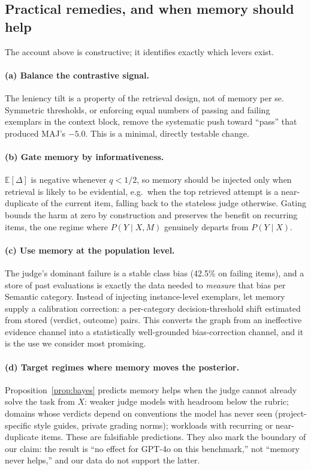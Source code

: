 \documentclass[11pt]{article}
\begin{document}
\subsection{Practical remedies, and when memory should help}
\label{sec:remedies}

The account above is constructive; it identifies exactly which levers exist.

\paragraph{(a) Balance the contrastive signal.} The leniency tilt is a property of the retrieval design, not of memory per se. Symmetric thresholds, or enforcing equal numbers of passing and failing exemplars in the context block, remove the systematic push toward ``pass'' that produced MAJ's $-5.0$. This is a minimal, directly testable change.

\paragraph{(b) Gate memory by informativeness.} $\mathbb{E}[\Delta]$ is negative whenever $q<1/2$, so memory should be injected only when retrieval is likely to be evidential, e.g.\ when the top retrieved attempt is a near-duplicate of the current item, falling back to the stateless judge otherwise. Gating bounds the harm at zero by construction and preserves the benefit on recurring items, the one regime where $P(Y\mid X,M)$ genuinely departs from $P(Y\mid X)$.

\paragraph{(c) Use memory at the population level.} The judge's dominant failure is a stable class bias (42.5\% on failing items), and a store of past evaluations is exactly the data needed to \emph{measure} that bias per Semantic category. Instead of injecting instance-level exemplars, let memory supply a calibration correction: a per-category decision-threshold shift estimated from stored (verdict, outcome) pairs. This converts the graph from an ineffective evidence channel into a statistically well-grounded bias-correction channel, and it is the use we consider most promising.

\paragraph{(d) Target regimes where memory moves the posterior.} Proposition~\ref{prop:bayes} predicts memory helps when the judge cannot already solve the task from $X$: weaker judge models with headroom below the rubric; domains whose verdicts depend on conventions the model has never seen (project-specific style guides, private grading norms); workloads with recurring or near-duplicate items. These are falsifiable predictions. They also mark the boundary of our claim: the result is ``no effect for GPT-4o on this benchmark,'' not ``memory never helps,'' and our data do not support the latter.
\end{document}
